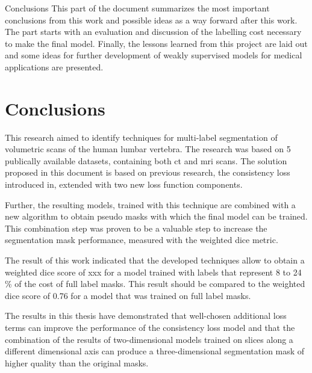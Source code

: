 \begin{partwithabstract}{Conclusions}
    This part of the document summarizes the most important conclusions from this work and possible ideas as a way forward after this work.
    The part starts with an evaluation and discussion of the labelling cost necessary to make the final model. 
    Finally, the lessons learned from this project are laid out and some ideas for further development of weakly supervised models for medical applications are presented. 
\end{partwithabstract}
\restoregeometry

\chapter{Conclusions}
\par{
    This research aimed to identify techniques for multi-label segmentation of volumetric scans of the human lumbar vertebra.
    The research was based on 5 publically available datasets, containing both \acrshort{ct} and \acrshort{mri} scans.
    The solution proposed in this document is based on previous research, the consistency loss introduced in\cite{Laradji}, extended with two new loss function components.  
}
\par{
    Further, the resulting models, trained with this technique are combined with a new algorithm to obtain pseudo masks with which the final model can be trained.
    This combination step was proven to be a valuable step to increase the segmentation mask performance, measured with the weighted dice metric.
}
\par{
    The result of this work indicated that the developed techniques allow to obtain a weighted dice score of xxx for a model trained with labels that represent 8 to 24 \% of the cost of full label masks.
    This result should be compared to the weighted dice score of 0.76 for a model that was trained on full label masks.
}
\par{
    The results in this thesis have demonstrated that well-chosen additional loss terms can improve the performance of the consistency loss model and 
    that the combination of the results of two-dimensional models trained on slices along a different dimensional axis can produce a three-dimensional segmentation mask of higher quality than the original masks.
}

